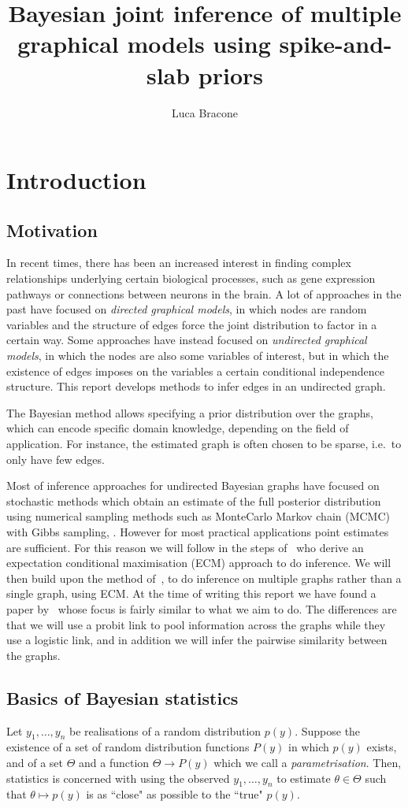 \documentclass{scrartcl}
\author{Luca Bracone}
\title{Bayesian joint inference of multiple graphical models using
spike-and-slab priors}
\newcommand{\1}{\mathds{1}}
\begin{document}
\maketitle

\section{Introduction}
\subsection{Motivation}
In recent times, there has been an increased interest in finding complex
relationships underlying certain biological processes, such as gene expression
pathways or connections between neurons in the brain. A lot of approaches in
the past have focused on \emph{directed graphical models}, in which nodes are
random variables and the structure of edges force the joint distribution to
factor in a certain way. Some approaches have instead focused on
\emph{undirected graphical models}, in which the nodes are also some variables
of interest, but in which the existence of edges imposes on the variables a
certain conditional independence structure. This report develops methods to
infer edges in an undirected graph.

The Bayesian method allows specifying a prior distribution over the graphs,
which can encode specific domain knowledge, depending on the field of
application. For instance, the estimated graph is often chosen to be sparse,
i.e.\ to only have few edges.

Most of inference approaches for undirected Bayesian graphs have focused on
stochastic methods which obtain an estimate of the full posterior distribution
using numerical sampling methods such as MonteCarlo Markov chain (MCMC) with
Gibbs sampling, \cite{wang-2015}. However for most practical applications point
estimates are sufficient. For this reason we will follow in the steps
of~\cite{limcco-2017} who derive an expectation conditional maximisation (ECM)
approach to do inference. We will then build upon the method
of~\cite{limcco-2017}, to do inference on multiple graphs rather than a single
graph, using ECM. At the time of writing this report we have found a paper
by~\cite{luke2017} whose focus is fairly similar to what we aim to do. The
differences are that we will use a probit link to pool information across the
graphs while they use a logistic link, and in addition we will infer the
pairwise similarity between the graphs.
\subsection{Basics of Bayesian statistics}
Let $y_1, \dots, y_n$ be realisations of a random distribution $p(y)$.
Suppose the existence of a set of
random distribution functions $P(y)$ in which $p(y)$ exists, and of
a set $\Theta$ and a function $\Theta \to P(y)$
which we call a \emph{parametrisation}.
Then, statistics is concerned with using the observed $y_1,\dots,y_n$ to estimate
$\theta \in \Theta$ such that $\theta \mapsto p(y)$ is as ``close" as possible
to the ``true" $p(y)$.
\end{document}
